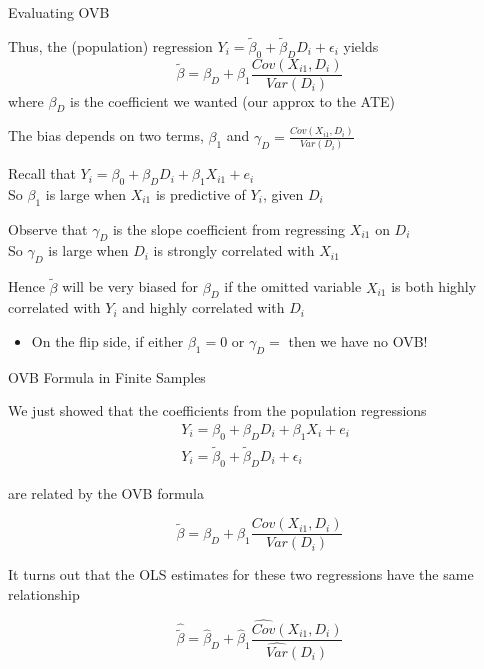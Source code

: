 \documentclass[11pt,english,handout]{beamer}
\newenvironment{wideitemize}{\itemize\addtolength{\itemsep}{10pt}}{\enditemize}
\begin{document}
\begin{frame}{Evaluating OVB}
	\begin{wideitemize}
		\item
		Thus, the (population) regression $Y_i = \tilde\beta_0 + \tilde\beta_D D_i + \epsilon_i$ yields
		$$\tilde{\beta}=\beta_D+\beta_1\frac{Cov(X_{i1},D_i)}{Var(D_i)}$$
		\noindent where $\beta_D$ is the coefficient we wanted (our approx to the ATE)
				
		\pause
		\item
		The bias depends on two terms, $\beta_1$ and $\gamma_D=\frac{Cov(X_{i1},D_i)}{Var(D_i)}$\\
		
		
		\pause
		\item
		Recall that $Y_i= \beta_0 + \beta_{D} D_i + \beta_{1} X_{i1} +e_i$ \\
		So $\beta_1$ is large when $X_{i1}$ is predictive of $Y_i$, given $D_i$
		
		\pause
		\item
		Observe that $\gamma_D$ is the slope coefficient from regressing $X_{i1}$ on $D_i$\\
		So $\gamma_D$ is large when $D_i$ is strongly correlated with $X_{i1}$	
		\pause
		\item
		Hence $\tilde\beta$ will be very biased for $\beta_D$ if the omitted variable $X_{i1}$ is both highly correlated with $Y_i$ and highly correlated with $D_i$\smallskip\pause{}
		\begin{itemize}
		\item On the flip side, if either $\beta_1=0$ or $\gamma_D=$ then we have no OVB!
		\end{itemize}
		
	\end{wideitemize}
	
\end{frame}


\begin{frame}{OVB Formula in Finite Samples}
	\begin{wideitemize}
		\item
		We just showed that the coefficients from the population regressions
		\begin{align}
		 & Y_i = \beta_0 + \beta_D D_i + \beta_1 X_i + e_i \\
		 & Y_i = \tilde\beta_0 + \tilde\beta_D D_i + \epsilon_i 
		\end{align}
	
	\noindent are related by the OVB formula
	
	$$\tilde{\beta}=\beta_D+\beta_1\frac{Cov(X_{i1},D_i)}{Var(D_i)}$$
	
	\pause
	\item
	It turns out that the OLS estimates for these two regressions have the same relationship
	
	$$\hat{\tilde{\beta}}= \hat{\beta}_D+ \hat{\beta}_1\frac{\widehat{Cov}(X_{i1},D_i)}{\widehat{Var}(D_i)}$$

	\end{wideitemize}
\end{frame}
\end{document}

